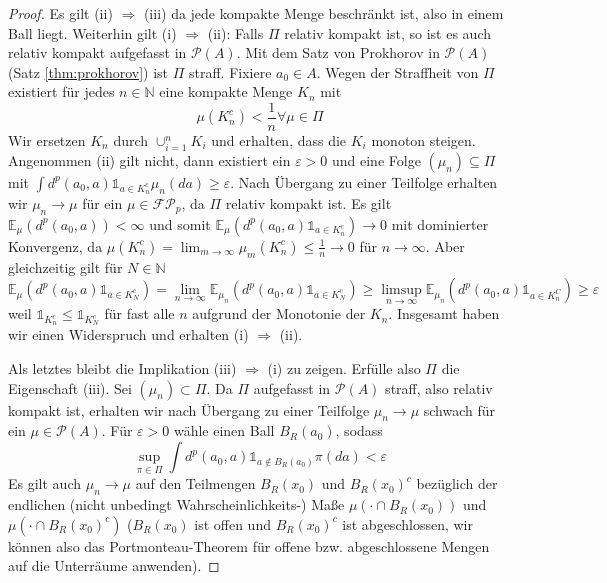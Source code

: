 \begin{proof}
    Es gilt (ii) $\Rightarrow$ (iii) da jede kompakte Menge beschränkt ist, also in einem Ball liegt. Weiterhin gilt (i) $\Rightarrow$ (ii): Falls $\Pi$ relativ kompakt ist, so ist es auch relativ kompakt aufgefasst in $\mathcal{P}(A)$. Mit dem Satz von Prokhorov in $\mathcal{P}(A)$ (Satz \ref{thm:prokhorov}) ist $\Pi$ straff. Fixiere $a_0 \in A$. Wegen der Straffheit von $\Pi$ existiert für jedes $n \in \mathbb{N}$ eine kompakte Menge $K_n$ mit 
    $$\mu(K_n^c) < \frac{1}{n} \forall \mu \in \Pi$$
    Wir ersetzen $K_n$ durch $\cup_{i=1}^n K_i$ und erhalten, dass die $K_i$ monoton steigen. Angenommen (ii) gilt nicht, dann existiert ein $\varepsilon > 0$ und eine Folge $(\mu_n) \subseteq \Pi$ mit $\int d^p(a_0, a) \mathds{1}_{a \in K_n^c} \mu_n(da) \geq \varepsilon$. Nach Übergang zu einer Teilfolge erhalten wir $\mu_n \rightarrow \mu$ für ein $\mu \in \mathcal{FP}_p$, da $\Pi$ relativ kompakt ist. Es gilt $\mathbb{E}_\mu(d^p(a_0, a)) < \infty$ und somit $\mathbb{E}_\mu(d^p(a_0, a) \mathds{1}_{a \in K_n^c}) \rightarrow 0$ mit dominierter Konvergenz, da $\mu(K_n^c) = \lim_{m\rightarrow \infty} \mu_m(K_n^c) \leq \frac{1}{n}\rightarrow 0$ für $n\rightarrow \infty$. Aber gleichzeitig gilt für $N \in \mathbb{N}$
    $$\mathbb{E}_\mu(d^p(a_0, a) \mathds{1}_{a \in K_N^c}) = \lim_{n\rightarrow\infty} \mathbb{E}_{\mu_n}(d^p(a_0, a) \mathds{1}_{a \in K_N^c}) \geq \limsup_{n\rightarrow \infty} \mathbb{E}_{\mu_n}(d^p(a_0, a) \mathds{1}_{a \in K_n^C}) \geq \varepsilon$$
    weil $\mathds{1}_{K_n^c} \leq \mathds{1}_{K_N^c}$ für fast alle $n$ aufgrund der Monotonie der $K_n$. Insgesamt haben wir einen Widerspruch und erhalten (i) $\Rightarrow$ (ii).

    Als letztes bleibt die Implikation (iii) $\Rightarrow$ (i) zu zeigen. Erfülle also $\Pi$ die Eigenschaft (iii). Sei $(\mu_n)\subset \Pi$. Da $\Pi$ aufgefasst in $\mathcal{P}(A)$ straff, also relativ kompakt ist, erhalten wir nach Übergang zu einer Teilfolge $\mu_n \rightarrow \mu$ schwach für ein $\mu \in \mathcal{P}(A)$. Für $\varepsilon > 0$ wähle einen Ball $B_R(a_0)$, sodass 
    $$\sup_{\pi \in \Pi} \int d^p(a_0, a) \mathds{1}_{a \notin B_R(a_0)} \pi(da) < \varepsilon$$
    Es gilt auch $\mu_n \rightarrow \mu$ auf den Teilmengen $B_R(x_0)$ und $B_R(x_0)^c$ bezüglich der endlichen (nicht unbedingt Wahrscheinlichkeits-) Maße $\mu(\cdot \cap B_R(x_0))$ und $\mu(\cdot \cap B_R(x_0)^c)$ ($B_R(x_0)$ ist offen und $B_R(x_0)^c$ ist abgeschlossen, wir können also das Portmonteau-Theorem für offene bzw. abgeschlossene Mengen auf die Unterräume anwenden). 


\end{proof}
